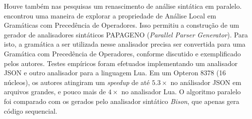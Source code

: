 Houve também nas pesquisas um renascimento de análise sintática em paralelo.
\cite{Barenghi:2015:PPM:2839536.2840146} encontrou uma maneira de explorar
a propriedade de Análise Local em Gramáticas com Precedência de Operadores.
Isso permitiu a construção de um gerador de analisadores sintáticos
PAPAGENO (\textit{Parallel Parser Generator}). Para isto, a gramática a
ser utilizada nesse analisador precisa ser convertida para uma Gramática
com Precedência de Operadores, conforme discutido e exemplificado pelos
autores. Testes empíricos foram efetuados implementando um analisador
JSON e outro analisador para a linguagem Lua. Em um Opteron 8378 (16 núcleos),
os autores atingiram um \textit{speedup} de até $5.3\times$ no análisador JSON
em arquivos grandes, e pouco mais de $4\times$ no analisador Lua. O algoritmo
paralelo foi comparado com os gerados pelo analisador sintático \textit{Bison},
que apenas gera código sequencial.



